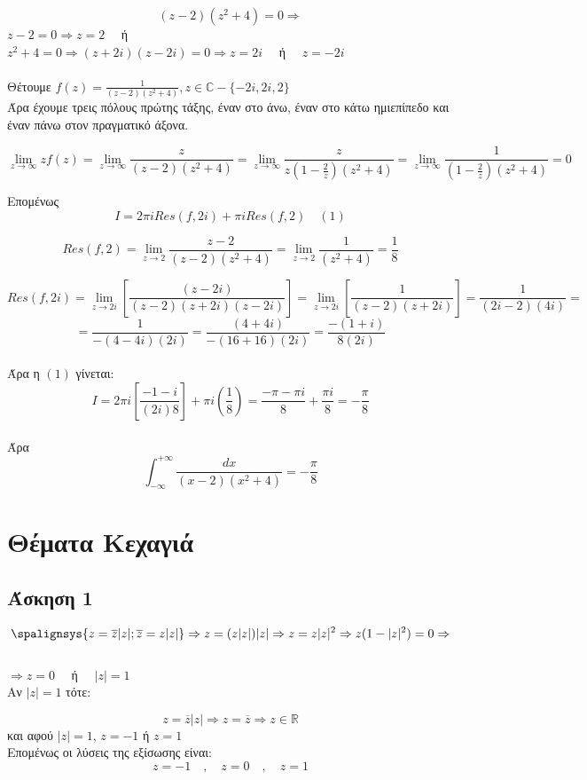 \documentclass[12pt]{article}
\begin{document}
$$ (z-2)(z^2+4)=0 \Rightarrow$$ 
$
z-2=0\Rightarrow z=2 \quad $ ή $ \quad$ 
\\
$ z^2+4=0\Rightarrow (z+2i)(z-2i)=0 \Rightarrow z=2i \quad$ ή $ \quad z=-2i$
\\
\\
Θέτουμε $ f(z)=\frac{1}{(z-2)(z^2+4)},z\in\mathbb{C}-\{-2i,2i,2\} $
\\
Άρα έχουμε τρεις πόλους πρώτης τάξης, έναν στο άνω, έναν στο κάτω ημιεπίπεδο και έναν πάνω στον πραγματικό άξονα.

$$ \lim_{z \to \infty } zf(z)=\lim_{z \to \infty } \frac{z}{(z-2)(z^2+4)}=
\lim_{z \to \infty } \frac{z}{z\left(1-\frac{2}{z}\right)(z^2+4)}=
\lim_{z \to \infty } \frac{1}{\left(1-\frac{2}{z}\right)(z^2+4)}=0$$

Επομένως $$ Ι= 2 \pi i Res(f,2i)+ \pi i Res(f,2)\quad (1) $$

$$  Res(f,2)=\lim_{z\to 2}\frac{z-2}{(z-2)(z^2+4)}=\lim_{z\to 2}\frac{1}{(z^2+4)}=\frac{1}{8}$$

$$ Res(f,2i)=\lim_{z\to 2i} \left[ \frac{(z-2i)}{(z-2)(z+2i)(z-2i)} \right]= \lim_{z\to 2i} \left[ \frac{1}{(z-2)(z+2i)} \right]=  \frac{1}{(2i-2)(4i)}= $$
$$ =\frac{1}{-(4-4i)(2i)}= \frac{(4+4i)}{-(16+16)(2i)}= \frac{-(1+i)}{8(2i)} $$
\\
Άρα η $(1)$ γίνεται:
\\
$$ Ι=2\pi i \left[ \frac{-1-i}{(2i)8} \right] + \pi i \left( \frac{1}{8} \right) = \frac{ -\pi -\pi i}{8} + \frac{ \pi i}{8}= -\frac{ \pi}{8}$$
\\
Άρα $$ \int_{-\infty}^{+\infty} \frac{dx}{(x-2)(x^2+4)}= -\frac{\pi}{8} $$
\newpage

 \section{Θέματα Κεχαγιά}

 \subsection{Άσκηση 1}

$$ \spalignsys{ z=\overline{z}|z|; \overline{z}=z|z|} \Rightarrow z=( z|z|)|z| \Rightarrow z=z|z|^2 \Rightarrow z(1-|z|^2)=0\Rightarrow $$
\\
$\Rightarrow z=0 \quad$ ή $\quad |z|=1 $
\\
Αν $|z|=1$ τότε:

$$ z=\overline{z}|z| \Rightarrow z=\overline{z} \Rightarrow z\in\mathbb{R}$$
και αφού $|z|=1$, $z=-1$ ή $z=1$
\\
Επομένως οι λύσεις της εξίσωσης είναι:
$$ z=-1 \quad ,\quad z=0 \quad,\quad z=1$$
\end{document}
